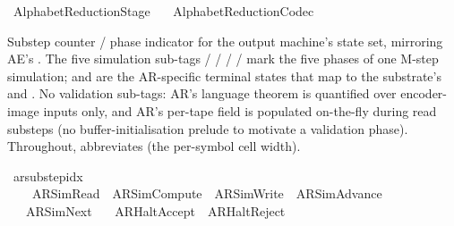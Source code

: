 %
\begin{isabellebody}%
%
%
\isadelimtheory
%
\endisadelimtheory
%
\isatagtheory
{}\isamarkupfalse%
\ AlphabetReduction{\isacharunderscore}{\kern0pt}Stage\isanewline
\ \ \ AlphabetReduction{\isacharunderscore}{\kern0pt}Codec\isanewline
{}%
\endisatagtheory
{\isafoldtheory}%
%
\isadelimtheory
%
\endisadelimtheory
%
\isadelimdocument
%
\endisadelimdocument
%
\isatagdocument
%
\isamarkuptrue%
%
\endisatagdocument
{\isafolddocument}%
%
\isadelimdocument
%
\endisadelimdocument
%
\begin{isamarkuptext}%
Substep counter / phase indicator for the output machine's
  state set, mirroring AE's .  The five
  simulation sub-tags  /
   /  /
   /  mark the five
  phases of one M-step simulation;  and
   are the AR-specific terminal states
  that map to the substrate's  and
  .  No validation sub-tags: AR's language
  theorem is quantified over encoder-image inputs only, and
  AR's per-tape  field is populated on-the-fly
  during read substeps (no buffer-initialisation prelude to
  motivate a validation phase).
  Throughout,  abbreviates  (the per-symbol cell width).%
\end{isamarkuptext}\isamarkuptrue%
\isamarkupfalse%
\ ar{\isacharunderscore}{\kern0pt}substep{\isacharunderscore}{\kern0pt}idx\ {\isacharequal}{\kern0pt}\isanewline
\ \ \ \ AR{\isacharunderscore}{\kern0pt}SimRead\ {\isacharbar}{\kern0pt}\ AR{\isacharunderscore}{\kern0pt}SimCompute\ {\isacharbar}{\kern0pt}\ AR{\isacharunderscore}{\kern0pt}SimWrite\ {\isacharbar}{\kern0pt}\ AR{\isacharunderscore}{\kern0pt}SimAdvance\isanewline
\ \ {\isacharbar}{\kern0pt}\ AR{\isacharunderscore}{\kern0pt}SimNext\isanewline
\ \ {\isacharbar}{\kern0pt}\ AR{\isacharunderscore}{\kern0pt}HaltAccept\ {\isacharbar}{\kern0pt}\ AR{\isacharunderscore}{\kern0pt}HaltReject\isanewline

\end{isabellebody}
